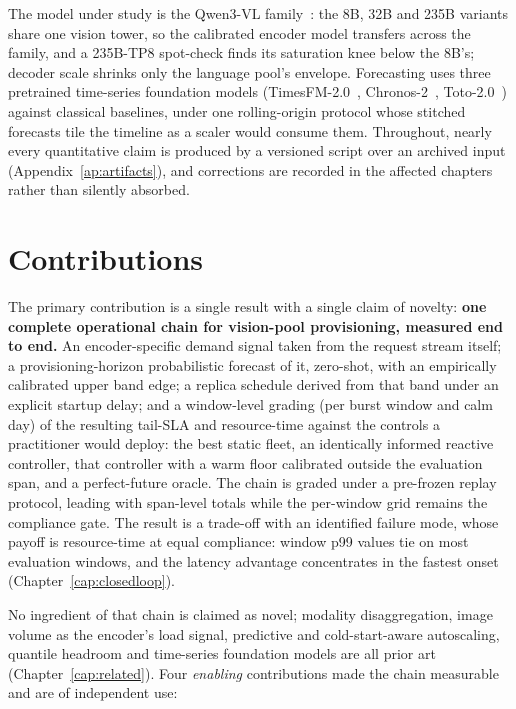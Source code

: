 The model under study is the Qwen3-VL family~\cite{Qwen3VL2025}: the 8B, 32B
and 235B variants share one vision tower, so the calibrated encoder model
transfers across the family, and a 235B-TP8 spot-check finds its saturation
knee below the 8B's; decoder scale shrinks only the language pool's
envelope. Forecasting uses three pretrained time-series foundation models
(TimesFM-2.0~\cite{Das2024TimesFM}, Chronos-2~\cite{Ansari2025Chronos2},
Toto-2.0~\cite{Khwaja2026Toto2}) against classical baselines, under one
rolling-origin protocol whose stitched forecasts tile the timeline as a
scaler would consume them. Throughout, nearly every quantitative claim is
produced by a versioned script over an archived input
(Appendix~\ref{ap:artifacts}), and corrections are recorded in the
affected chapters rather than silently absorbed.

\section{Contributions}
\label{sec:intro-contrib}

The primary contribution is a single result with a single claim of novelty:
\textbf{one complete operational chain for vision-pool provisioning,
measured end to end.} An encoder-specific demand signal taken from the
request stream itself; a provisioning-horizon probabilistic forecast of it,
zero-shot, with an empirically calibrated upper band edge; a replica
schedule derived from that band under an explicit startup delay; and a
window-level grading (per burst window and calm day) of the resulting
tail-SLA and resource-time against
the controls a practitioner would deploy: the best static fleet, an
identically informed reactive controller, that controller with a warm floor
calibrated outside the evaluation span, and a perfect-future oracle. The
chain is graded under a pre-frozen replay protocol, leading with
span-level totals while the per-window grid remains the compliance
gate. The result is a
trade-off with an identified failure mode, whose payoff is
resource-time at equal compliance: window p99 values tie on most
evaluation windows, and the latency advantage concentrates in the fastest
onset (Chapter~\ref{cap:closedloop}).

No ingredient of that chain is claimed as novel; modality disaggregation,
image volume as the encoder's load signal, predictive and cold-start-aware
autoscaling, quantile headroom and time-series foundation models are all
prior art (Chapter~\ref{cap:related}). Four \emph{enabling} contributions
made the chain measurable and are of independent use:

